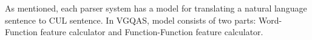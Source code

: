 \label{sec:model}
As mentioned, each parser system has a model for translating a natural language sentence to CUL sentence. In VGQAS, model consists of two parts: Word-Function feature calculator and Function-Function feature calculator.


